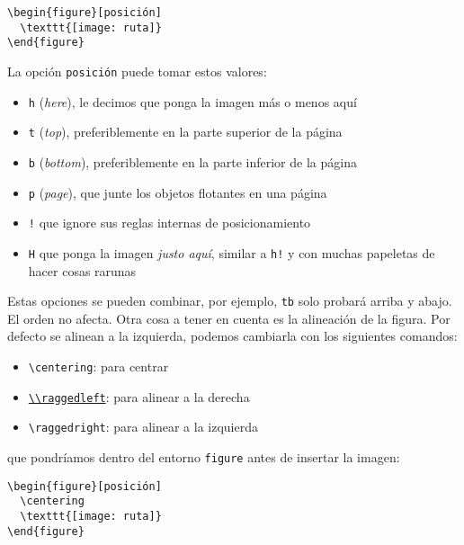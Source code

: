 \begin{lstlisting}[language={[latex]tex}]
\begin{figure}[posición]
  \texttt{[image: ruta]}
\end{figure}
\end{lstlisting}

La opción \lstinline!posición! puede tomar estos valores:

\begin{itemize}
\item
  \lstinline!h! (\emph{here}), le decimos que ponga la imagen más o
  menos aquí
\item
  \lstinline!t! (\emph{top}), preferiblemente en la parte superior de la
  página
\item
  \lstinline!b! (\emph{bottom}), preferiblemente en la parte inferior de
  la página
\item
  \lstinline!p! (\emph{page}), que junte los objetos flotantes en una
  página
\item
  \lstinline"!" que ignore sus reglas internas de posicionamiento
\item
  \lstinline!H! que ponga la imagen \emph{justo aquí}, similar a
  \lstinline"h!" y con muchas papeletas de hacer cosas rarunas
\end{itemize}

Estas opciones se pueden combinar, por ejemplo, \lstinline!tb! solo
probará arriba y abajo. El orden no afecta. Otra cosa a tener en cuenta
es la alineación de la figura. Por defecto se alinean a la izquierda,
podemos cambiarla con los siguientes comandos:

\begin{itemize}
\item
  \lstinline!\centering!: para centrar
\item
  \href{http://printwiki.org/Ragged_Left}{\lstinline!\\raggedleft!}: para
  alinear a la derecha
\item
  \lstinline!\raggedright!: para alinear a la izquierda
\end{itemize}

que pondríamos dentro del entorno \lstinline!figure! antes de insertar
la imagen:

\begin{lstlisting}[language={[latex]tex}]
\begin{figure}[posición]
  \centering
  \texttt{[image: ruta]}
\end{figure}
\end{lstlisting}

